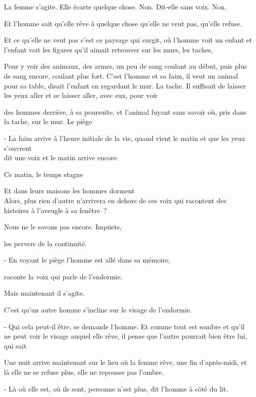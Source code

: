 La femme s'agite. Elle écarte quelque chose. Non. Dit-elle sans voix.
Non.

Et l'homme sait qu'elle rêve à quelque chose qu'elle ne veut pas,
qu'elle refuse.

Et ce qu'elle ne veut pas c'est ce paysage qui surgit, où l'homme voit
un enfant et l'enfant voit les figures qu'il aimait retrouver sur les
murs, les taches,

Pour y voir des animaux, des armes, un peu de sang coulant au début,
puis plus de sang encore, coulant plus fort. C'est l'homme et sa faim,
il veut un animal pour sa table, disait l'enfant en regardant le mur. La
tache. Il suffisait de laisser les yeux aller et se laisser aller, avec
eux, pour voir

des hommes derrière, à sa poursuite, et l'animal fuyant sans savoir où,
pris dans la tache, sur le mur. Le piège

\pagebreak

- La faim arrive à l'heure initiale de la vie, quand vient le matin et
que les yeux s'ouvrent\\

dit une voix et le matin arrive encore.

Ce matin, le temps stagne

Et dans leurs maisons les hommes dorment\\

Alors, plus rien d'autre n'arrivera en dehors de ces voix qui racontent
des histoires à l'aveugle à sa fenêtre~?

Nous ne le savons pas encore. Inquiets,

les pervers de la continuité.

\pagebreak

- En voyant le piège l'homme est allé dans sa mémoire,

raconte la voix qui parle de l'endormie.

Mais maintenant il s'agite.

C'est qu'un autre homme s'incline sur le visage de l'endormie.

- Qui cela peut-il être, se demande l'homme. Et comme tout est sombre et
qu'il ne peut voir le visage auquel elle rêve, il pense que l'autre
pourrait bien être lui, qui sait

Une nuit arrive maintenant sur le lieu où la femme rêve, une fin
d'après-midi, et là elle ne se refuse plus, elle ne repousse pas
l'ombre.

- Là où elle est, où ils sont, personne n'est plus, dit l'homme à côté
du lit.

